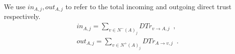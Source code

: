 \begin{definition}
\label{inouttrust}
  We use $in_{A, j}, out_{A, j}$ to refer to the total incoming and outgoing direct trust respectively.
  \begin{equation}
    \begin{gathered}
    in_{A, j} = \sum\limits_{v \in N^{-}\left(A\right)_j}DTr_{v \rightarrow A,
    j} \enspace, \\
    out_{A, j} = \sum\limits_{v \in N^{+}\left(A\right)_j}DTr_{A \rightarrow v, j} \enspace.
    \end{gathered}
  \end{equation}
\end{definition}
